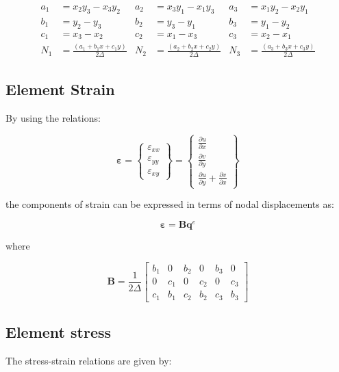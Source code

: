 \begin{align*}
	a_1 &= x_2 y_3 - x_3 y_2 & a_2 &= x_3 y_1 - x_1 y_3 & a_3 &= x_1 y_2 - x_2 y_1 \\
	b_1 &= y_2 - y_3 & b_2 &= y_3 - y_1 & b_3 &= y_1 - y_2 \\
	c_1 &= x_3 - x_2 & c_2 &= x_1 - x_3 & c_3 &= x_2 - x_1 \\
	N_1 &= \frac{( a_1 + b_1 x + c_1 y)}{2\Delta} & N_2 &= \frac{( a_2 + b_2 x + c_2 y)}{2\Delta} & N_3 &= \frac{( a_3 + b_3 x + c_3 y)}{2\Delta}
\end{align*}

\subsection{Element Strain}
By using the relations:

\begin{equation}
\mathbf{\varepsilon} = \left\lbrace \begin{array}{c}
\varepsilon_{xx} \\ 
\varepsilon_{yy} \\ 
\varepsilon_{xy}
\end{array} \right\rbrace = \left\lbrace \begin{array}{c}
\frac{\partial u}{\partial x} \\ 
\frac{\partial v}{\partial y} \\ 
\frac{\partial u}{\partial y}+\frac{\partial v}{\partial x}
\end{array}  \right\rbrace 
\end{equation}

the components of strain can be expressed in terms of nodal displacements as:

\begin{equation}
\mathbf{\varepsilon} = \mathbf{B} \mathbf{q}^e
\end{equation}

where

\begin{equation}\label{eq: CST_strain_disp_matrix}
\mathbf{B} = \frac{1}{2\Delta} \begin{bmatrix}
b_1 & 0 & b_2 & 0 & b_3 & 0 \\ 
0 & c_1 & 0 & c_2 & 0 & c_3 \\ 
c_1 & b_1 & c_2 & b_2 & c_3 & b_3
\end{bmatrix} 
\end{equation}

\subsection{Element stress}
The stress-strain relations are given by:

